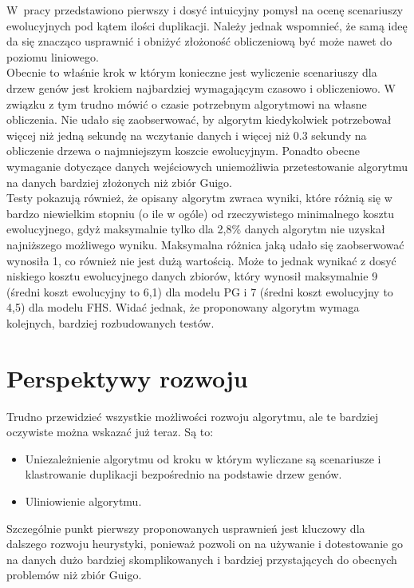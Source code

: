 \documentclass[licencjacka]{pracamgr}
\begin{document}
W~pracy przedstawiono pierwszy i dosyć intuicyjny pomysł na ocenę scenariuszy ewolucyjnych pod kątem ilości duplikacji. Należy jednak wspomnieć, że samą ideę da się znacząco usprawnić i obniżyć złożoność obliczeniową być może nawet do poziomu liniowego. 
\\
Obecnie to właśnie krok w którym konieczne jest wyliczenie scenariuszy dla drzew genów jest krokiem najbardziej wymagającym czasowo i obliczeniowo.  W związku z tym trudno mówić o czasie potrzebnym algorytmowi na własne obliczenia. Nie udało się zaobserwować, by algorytm kiedykolwiek potrzebował więcej niż jedną sekundę na wczytanie danych i więcej niż 0.3 sekundy na obliczenie drzewa o najmniejszym koszcie ewolucyjnym. Ponadto obecne wymaganie dotyczące danych wejściowych uniemożliwia  przetestowanie algorytmu na danych bardziej złożonych niż zbiór Guigo. 
\\
Testy pokazują również, że opisany algorytm zwraca wyniki, które różnią się w bardzo niewielkim stopniu (o ile w ogóle) od rzeczywistego minimalnego kosztu ewolucyjnego, gdyż maksymalnie tylko dla 2,8\% danych algorytm nie uzyskał najniższego możliwego wyniku. Maksymalna różnica jaką udało się zaobserwować wynosiła 1, co również nie jest dużą wartością. Może to jednak wynikać z dosyć niskiego kosztu ewolucyjnego danych zbiorów, który wynosił maksymalnie 9 (średni koszt ewolucyjny to 6,1) dla modelu PG i 7 (średni koszt ewolucyjny to 4,5) dla modelu FHS. Widać jednak, że proponowany algorytm wymaga kolejnych, bardziej rozbudowanych testów.


\section{Perspektywy rozwoju}

Trudno przewidzieć wszystkie możliwości rozwoju algorytmu, ale te bardziej
oczywiste można wskazać już teraz.  Są to:
\begin{itemize}
\item Uniezależnienie algorytmu od kroku w którym wyliczane są scenariusze i klastrowanie duplikacji bezpośrednio na podstawie drzew genów.
\item Uliniowienie algorytmu.
\end{itemize}

Szczególnie punkt pierwszy proponowanych usprawnień jest kluczowy dla dalszego rozwoju heurystyki, ponieważ pozwoli on na używanie i dotestowanie go na danych dużo bardziej skomplikowanych i bardziej przystających do obecnych problemów niż zbiór Guigo.
\end{document}
